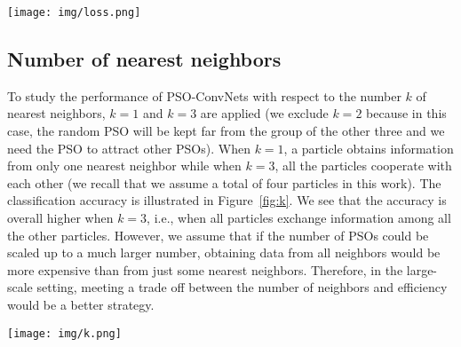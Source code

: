 \documentclass{ieeeaccess}
\begin{document}
\begin{figure*}[htb!]
\begin{center}
\texttt{[image: img/loss.png]}
\caption{Effects of $\beta$ to distances between PSOs for $\beta=0.5$ and $\beta=2$.}
\label{fig:loss}
\end{center}
\end{figure*}
\subsection{Number of nearest neighbors}
To study the performance of PSO-ConvNets with respect to the number $k$ of nearest neighbors,  $k=1$ and $k=3$  are applied (we exclude $k=2$ because in this case, the random PSO will be kept far from the group of the other three and we need the PSO to attract other PSOs). When $k=1$, a particle obtains information from only one nearest neighbor while when $k=3$, all the particles cooperate with each other (we recall that we assume a total of four particles in this work). The classification accuracy is illustrated in Figure~\ref{fig:k}. We see that the accuracy is overall higher when $k=3$, i.e., when all particles exchange information among all the other particles. However, we assume that if the number of PSOs could be scaled up to a much larger number, obtaining data from all neighbors would be more expensive than from just some nearest neighbors. Therefore, in the large-scale setting, meeting a trade off between the number of neighbors and efficiency would be a better strategy.
\begin{figure*}[htb!]
\begin{center}
\texttt{[image: img/k.png]}
\caption{Comparison accuracy performance when number of nearest neighbors $k=3$ and $k=1$.}
\label{fig:k}
\end{center}
\end{figure*}
\end{document}
